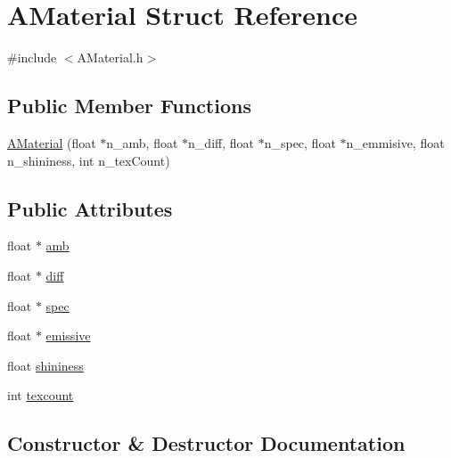 \hypertarget{struct_a_material}{}\section{A\+Material Struct Reference}
\label{struct_a_material}


{\ttfamily \#include $<$A\+Material.\+h$>$}

\subsection*{Public Member Functions}
\begin{DoxyCompactItemize}
\item 
\hyperlink{struct_a_material_a87e3187b25f18708503f464b85292446}{A\+Material} (float $\ast$n\+\_\+amb, float $\ast$n\+\_\+diff, float $\ast$n\+\_\+spec, float $\ast$n\+\_\+emmisive, float n\+\_\+shininess, int n\+\_\+tex\+Count)
\end{DoxyCompactItemize}
\subsection*{Public Attributes}
\begin{DoxyCompactItemize}
\item 
float $\ast$ \hyperlink{struct_a_material_a7d78da6f12281285ff0e674420ee0cef}{amb}
\item 
float $\ast$ \hyperlink{struct_a_material_a7511ed9b31c619c784f0b8f8f82da173}{diff}
\item 
float $\ast$ \hyperlink{struct_a_material_a34adf01d2a83a57f707a4e1f230f3aa9}{spec}
\item 
float $\ast$ \hyperlink{struct_a_material_a5d3d52b9923b946b2050e7753b39a471}{emissive}
\item 
float \hyperlink{struct_a_material_a392b66356673ad7beb4964a353c93429}{shininess}
\item 
int \hyperlink{struct_a_material_a188a4f0c36c5a95beaa4d99f38ee098f}{texcount}
\end{DoxyCompactItemize}


\subsection{Constructor \& Destructor Documentation}
\mbox{\label{struct_a_material_a87e3187b25f18708503f464b85292446}} 
